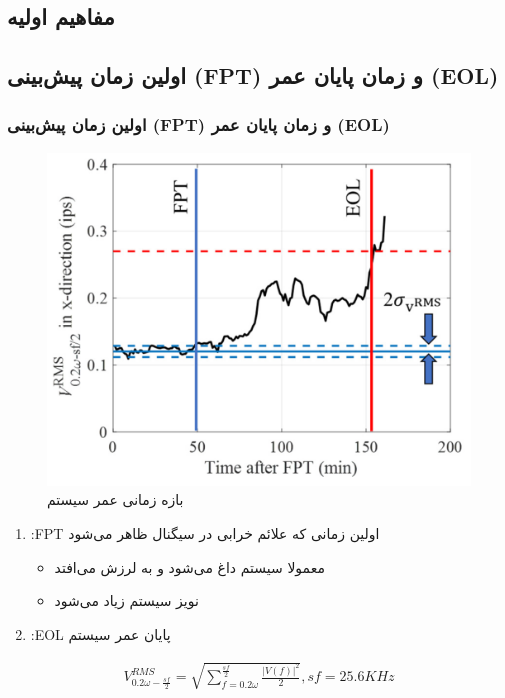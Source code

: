 \documentclass[xcolor=dvipsnames, professionalfonts, aspectratio=169, 11pt]{beamer}
\begin{document}
\begin{persian}
\section{مفاهیم اولیه}

\subsection{اولین زمان پیش‌بینی (FPT) و زمان پایان عمر (EOL)}
\begin{frame}
	\frametitle{اولین زمان پیش‌بینی (FPT) و زمان پایان عمر (EOL)}
	
	
	\begin{multicols}{2}
		\begin{figure}
			\vspace{0em}
			\includegraphics[height=0.6\textheight]{img/img3.png}
			\caption{بازه زمانی عمر سیستم \cite{lu2021gan}}
		\end{figure}
		
		\begin{enumerate}
			\item :FPT اولین زمانی که علائم خرابی در سیگنال ظاهر می‌شود
			\begin{itemize}
				\item معمولا سیستم داغ می‌شود و به لرزش می‌افتد
				\item نویز سیستم زیاد می‌شود
			\end{itemize}
			\item :EOL پایان عمر سیستم
		\end{enumerate}
		
		\pause
		\begin{eqnarray}
		V_{0.2\omega-\frac{sf}{2	}}^{RMS}=\sqrt{\sum_{f=0.2\omega}^{\frac{sf}{2}}\frac{|V(f)|^2}{2}} , sf=25.6 KHz
		\end{eqnarray}
		

\end{multicols}
\end{frame}
\end{persian}
\end{document}
